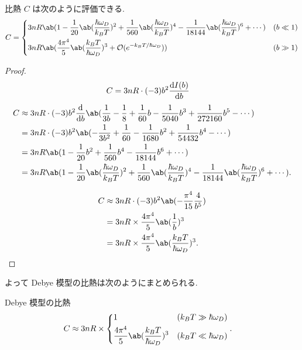 \documentclass[a4paper,11pt]{jlreq}
\begin{document}
\begin{theorem}
  比熱 $C$ は次のように評価できる.
  \begin{align}
    C =
    \begin{dcases}
      3nR\ab(1 - \frac{1}{20}\ab(\frac{\hbar\omega_D}{k_BT})^2 + \frac{1}{560}\ab(\frac{\hbar\omega_D}{k_BT})^4 - \frac{1}{18144}\ab(\frac{\hbar\omega_D}{k_BT})^6 + \cdots) & (b\ll 1) \\
      3nR\ab(\frac{4\pi^4}{5}\ab(\frac{k_BT}{\hbar\omega_D})^3 + \mathcal{O}(e^{-k_BT/\hbar\omega_D}))                                                                       & (b\gg 1)
    \end{dcases}
  \end{align}
\end{theorem}
\begin{proof}
  \begin{align}
    C & = 3nR\cdot (-3)b^2\diff{I(b)}{b}
  \end{align}
  \begin{align}
    C & \approx 3nR\cdot (-3)b^2\diff{}{b}\ab(\frac{1}{3b} - \frac{1}{8} + \frac{1}{60}b - \frac{1}{5040}b^3 + \frac{1}{272160}b^5 - \cdots)                                      \\
      & = 3nR\cdot (-3)b^2\ab(-\frac{1}{3b^2} + \frac{1}{60} - \frac{1}{1680}b^2 + \frac{1}{54432}b^4 - \cdots)                                                                   \\
      & = 3nR\ab(1 - \frac{1}{20}b^2 + \frac{1}{560}b^4 - \frac{1}{18144}b^6 + \cdots)                                                                                            \\
      & = 3nR\ab(1 - \frac{1}{20}\ab(\frac{\hbar\omega_D}{k_BT})^2 + \frac{1}{560}\ab(\frac{\hbar\omega_D}{k_BT})^4 - \frac{1}{18144}\ab(\frac{\hbar\omega_D}{k_BT})^6 + \cdots).
  \end{align}

  \begin{align}
    C & \approx 3nR\cdot(-3)b^2\ab(-\frac{\pi^4}{15}\frac{4}{b^5})    \\
      & = 3nR\times\frac{4\pi^4}{5}\ab(\frac{1}{b})^3                 \\
      & = 3nR\times\frac{4\pi^4}{5}\ab(\frac{k_BT}{\hbar\omega_D})^3.
  \end{align}
\end{proof}

よって Debye 模型の比熱は次のようにまとめられる.
\begin{itembox}[l]{Debye 模型の比熱}
  \begin{align}
    C & \approx 3nR\times\begin{dcases}
                           1                                                 & (k_BT\gg \hbar\omega_D) \\
                           \frac{4\pi^4}{5}\ab(\frac{k_BT}{\hbar\omega_D})^3 & (k_BT\ll \hbar\omega_D)
                         \end{dcases}.
  \end{align}
\end{itembox}
\end{document}
